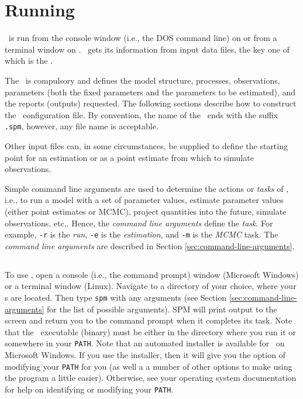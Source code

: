 \section{Running \SPM\label{sec:running-spm}}

\SPM\ is run from the console window (i.e., the DOS command line) on  or from a terminal window on . \SPM\ gets its information from input data files, the key one of which is the \config{}. 

The \config\ is compulsory and defines the model structure, processes, observations, parameters (both the fixed parameters and the parameters to be estimated), and the reports (outputs) requested. The following sections  describe how to construct the \SPM\ configuration file. By convention, the name of the \config\ ends with the suffix \texttt{.spm}, however, any file name is acceptable.

Other input files can, in some circumstances, be supplied to define the starting point for an estimation %
or as a point estimate from which to simulate observations.

Simple command line arguments are used to determine the actions or \emph{tasks} of \SPM, i.e., to run a model with a set of parameter values, estimate parameter values (either point estimates or MCMC), project quantities into the future, simulate observations, etc,. Hence, the \emph{command line arguments} define the \emph{task}. For example, \texttt{-r} is the \emph{run}, \texttt{-e} is the \emph{estimation}, and \texttt{-m} is the \emph{MCMC} task. The \emph{command line arguments} are described in Section \ref{sec:command-line-arguments}.

\subsection{}

To use \SPM, open a console (i.e., the command prompt) window (Microsoft Windows) or a terminal window (Linux). Navigate to a directory of your choice, where your \config s are located. Then type \texttt{spm} with any arguments (see Section \ref{sec:command-line-arguments} for the list of possible arguments). SPM will print output to the screen and return you to the command prompt when it completes its task. Note that the \SPM\ executable (binary) must be either in the directory where you run it or somewhere in your \texttt{PATH}. Note that an automated installer is available for \SPM\ on Microsoft Windows. If you use the installer, then it will give you the option of modifying your \texttt{PATH} for you (as well a a number of other options to make using the program a little easier). Otherwise, see your operating system documentation for help on identifying or modifying your \texttt{PATH}.

